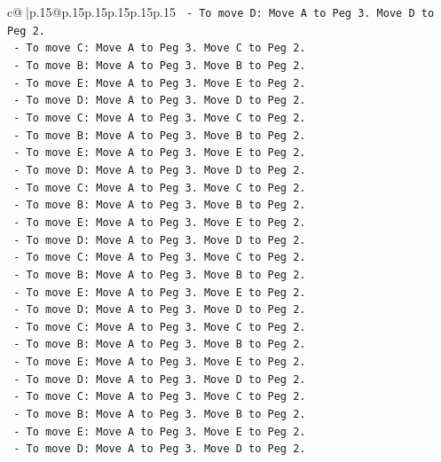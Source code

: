 \documentclass{article}
\begin{document}
{\begin{supertabular}{c@{$\;$}|p{.15\linewidth}@{}p{.15\linewidth}p{.15\linewidth}p{.15\linewidth}p{.15\linewidth}p{.15\linewidth}}
{{{\texttt{    {-}   To move D: Move A to Peg 3. Move D to Peg 2.} \\
\texttt{    {-}   To move C: Move A to Peg 3. Move C to Peg 2.} \\
\texttt{    {-}   To move B: Move A to Peg 3. Move B to Peg 2.} \\
\texttt{    {-}   To move E: Move A to Peg 3. Move E to Peg 2.} \\
\texttt{    {-}   To move D: Move A to Peg 3. Move D to Peg 2.} \\
\texttt{    {-}   To move C: Move A to Peg 3. Move C to Peg 2.} \\
\texttt{    {-}   To move B: Move A to Peg 3. Move B to Peg 2.} \\
\texttt{    {-}   To move E: Move A to Peg 3. Move E to Peg 2.} \\
\texttt{    {-}   To move D: Move A to Peg 3. Move D to Peg 2.} \\
\texttt{    {-}   To move C: Move A to Peg 3. Move C to Peg 2.} \\
\texttt{    {-}   To move B: Move A to Peg 3. Move B to Peg 2.} \\
\texttt{    {-}   To move E: Move A to Peg 3. Move E to Peg 2.} \\
\texttt{    {-}   To move D: Move A to Peg 3. Move D to Peg 2.} \\
\texttt{    {-}   To move C: Move A to Peg 3. Move C to Peg 2.} \\
\texttt{    {-}   To move B: Move A to Peg 3. Move B to Peg 2.} \\
\texttt{    {-}   To move E: Move A to Peg 3. Move E to Peg 2.} \\
\texttt{    {-}   To move D: Move A to Peg 3. Move D to Peg 2.} \\
\texttt{    {-}   To move C: Move A to Peg 3. Move C to Peg 2.} \\
\texttt{    {-}   To move B: Move A to Peg 3. Move B to Peg 2.} \\
\texttt{    {-}   To move E: Move A to Peg 3. Move E to Peg 2.} \\
\texttt{    {-}   To move D: Move A to Peg 3. Move D to Peg 2.} \\
\texttt{    {-}   To move C: Move A to Peg 3. Move C to Peg 2.} \\
\texttt{    {-}   To move B: Move A to Peg 3. Move B to Peg 2.} \\
\texttt{    {-}   To move E: Move A to Peg 3. Move E to Peg 2.} \\
\texttt{    {-}   To move D: Move A to Peg 3. Move D to Peg 2.} \\
}}}
\end{supertabular}}
\end{document}
